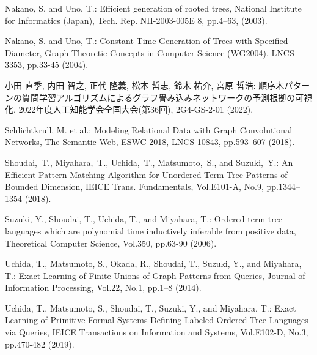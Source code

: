 \begin{thebibliography}{99}
  Nakano, S. and Uno, T.:
  Efficient generation of rooted trees,
  National Institute for Informatics (Japan),
  Tech. Rep. NII-2003-005E 8,
  pp.4--63, (2003).

  Nakano, S. and Uno, T.:
  Constant Time Generation of Trees with Specified Diameter, Graph-Theoretic Concepts in Computer Science (WG2004),
  LNCS 3353, pp.33-45 (2004).

  小田 直季, 内田 智之, 正代 隆義, 松本 哲志, 鈴木 祐介, 宮原 哲浩:
  順序木パターンの質問学習アルゴリズムによるグラフ畳み込みネットワークの予測根拠の可視化,
  2022年度人工知能学会全国大会(第36回), 2G4-GS-2-01 (2022).

  Schlichtkrull, M. et al.: 
  Modeling Relational Data with Graph Convolutional Networks, 
  The Semantic Web, ESWC 2018, LNCS 10843, pp.593--607 (2018). 

  Shoudai,~T., Miyahara,~T., Uchida,~T., Matsumoto,~S., and Suzuki,~Y.:
  An Efficient Pattern Matching Algorithm for Unordered Term Tree Patterns of Bounded Dimension,
  IEICE Trans. Fundamentals, Vol.E101-A, No.9, pp.1344--1354 (2018).

  Suzuki, Y., Shoudai, T., Uchida, T., and Miyahara, T.:
  Ordered term tree languages which are polynomial time inductively inferable from positive data,
  Theoretical Computer Science, Vol.350, pp.63-90 (2006).

  Uchida, T., Matsumoto, S., Okada, R., Shoudai, T., Suzuki, Y., and Miyahara, T.:
  Exact Learning of Finite Unions of Graph Patterns from Queries,
  Journal of Information Processing, Vol.22, No.1, pp.1--8 (2014).

  Uchida, T., Matsumoto, S., Shoudai, T., Suzuki, Y., and Miyahara, T.:
  Exact Learning of Primitive Formal Systems Defining Labeled Ordered Tree Languages via Queries,
  IEICE Transactions on Information and Systems, Vol.E102-D, No.3, pp.470-482 (2019).



\end{thebibliography}


